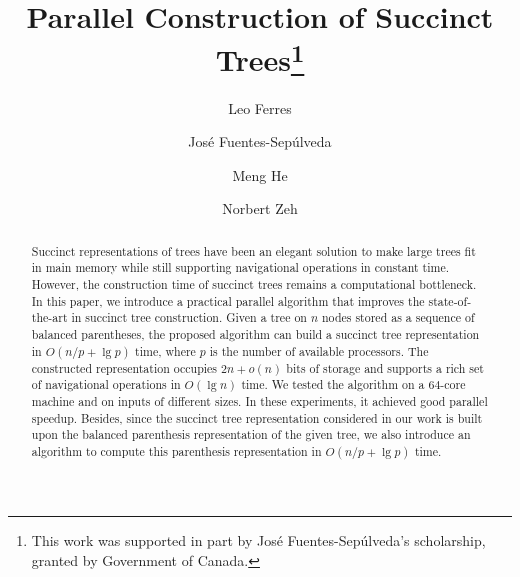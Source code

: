 \documentclass[runningheads]{llncs}
\begin{document}
\title{Parallel Construction of Succinct Trees\thanks{This work was supported in part by Jos\'e Fuentes-Sepúlveda's scholarship, granted by Government of Canada.}}

\author{Leo Ferres \and Jos\'e Fuentes-Sep\'ulveda \and Meng He \and Norbert Zeh}

%
%
  

\maketitle              %

\begin{abstract}
Succinct representations of trees have been an elegant solution to make large trees fit in main memory while still supporting
navigational operations in constant time. However, the construction time of succinct trees remains a computational bottleneck. In this
paper, we introduce a practical parallel algorithm that improves the state-of-the-art in succinct tree construction. Given a tree on
$n$ nodes stored as a sequence of balanced parentheses, the proposed algorithm can build a succinct tree representation in
$O(n/p+\lg p)$ time, where $p$ is the number of available processors. The constructed representation occupies $2n + o(n)$
bits of storage and supports a rich set of navigational operations in $O(\lg n)$ time. We tested the algorithm on a $64$-core
machine and on inputs of different sizes.
In these experiments, it achieved good parallel speedup.
Besides, since the succinct tree representation considered in our work is built upon the balanced parenthesis representation of the given
tree, we also introduce an algorithm to compute this parenthesis representation in $O(n/p+\lg p)$ time.
\end{abstract}
%

\end{document}
